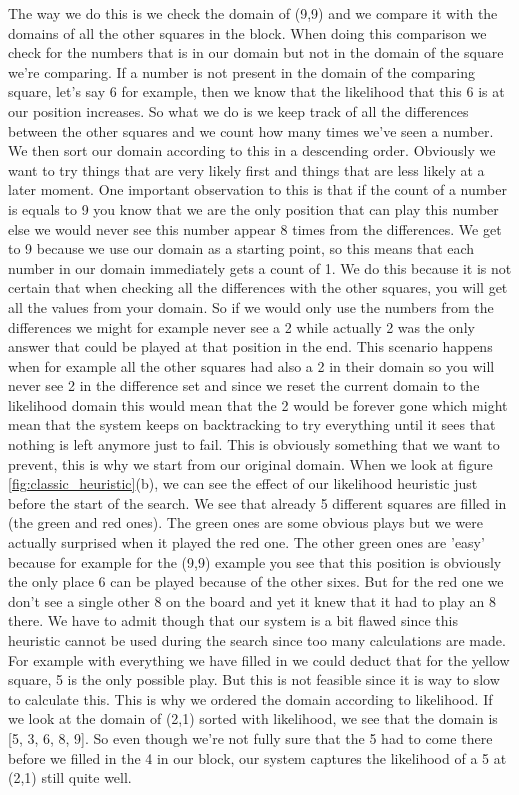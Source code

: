\documentclass{report}
\begin{document}
The way we do this is we check the domain of (9,9) and we compare it with the domains of all the other squares in the block. When doing this comparison we check for the numbers that is in our domain but not in the domain of the square we're comparing. If a number is not present in the domain of the comparing square, let's say 6 for example, then we know that the likelihood that this 6 is at our position increases. So what we do is we keep track of all the differences between the other squares and we count how many times we've seen a number. We then sort our domain according to this in a descending order. Obviously we want to try things that are very likely first and things that are less likely at a later moment. One important observation to this is that if the count of a number is equals to 9 you know that we are the only position that can play this number else we would never see this number appear 8 times from the differences. We get to 9 because we use our domain as a starting point, so this means that each number in our domain immediately gets a count of 1. We do this because it is not certain that when checking all the differences with the other squares, you will get all the values from your domain. So if we would only use the numbers from the differences we might for example never see a 2 while actually 2 was the only answer that could be played at that position in the end. 
\newline
\newline
This scenario happens when for example all the other squares had also a 2 in their domain so you will never see 2 in the difference set and since we reset the current domain to the likelihood domain this would mean that the 2 would be forever gone which might mean that the system keeps on backtracking to try everything until it sees that nothing is left anymore just to fail. This is obviously something that we want to prevent, this is why we start from our original domain. When we look at figure \ref{fig:classic_heuristic}(b), we can see the effect of our likelihood heuristic just before the start of the search. We see that already 5 different squares are filled in (the green and red ones). The green ones are some obvious plays but we were actually surprised when it played the red one. The other green ones are 'easy' because for example for the (9,9) example you see that this position is obviously the only place 6 can be played because of the other sixes. But for the red one we don't see a single other 8 on the board and yet it knew that it had to play an 8 there. We have to admit though that our system is a bit flawed since this heuristic cannot be used during the search since too many calculations are made. For example with everything we have filled in we could deduct that for the yellow square, 5 is the only possible play. But this is not feasible since it is way to slow to calculate this. This is why we ordered the domain according to likelihood. If we look at the domain of (2,1) sorted with likelihood, we see that the domain is [5, 3, 6, 8, 9]. So even though we're not fully sure that the 5 had to come there before we filled in the 4 in our block, our system captures the likelihood of a 5 at (2,1) still quite well.
\end{document}
